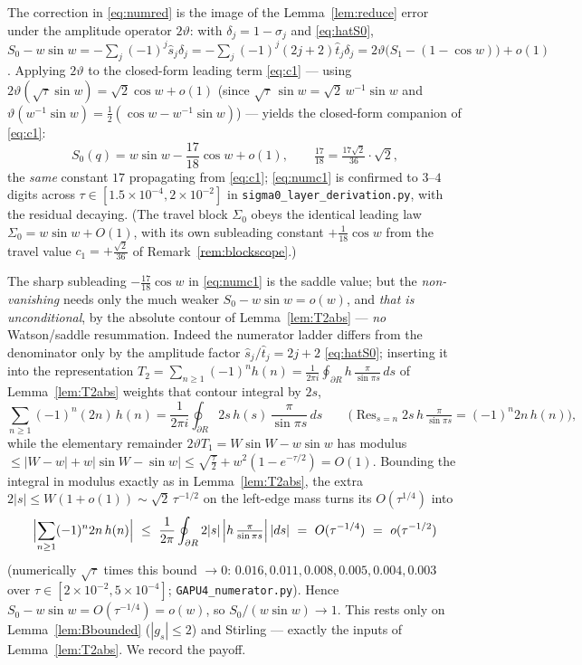 \noindent The correction in \eqref{eq:numred} is the image of the
Lemma~\ref{lem:reduce} error under the amplitude operator $2\vartheta$: with
$\delta_j=1-\sigma_j$ and \eqref{eq:hatS0},
$S_0-w\sin w=-\sum_j(-1)^j\hat s_j\delta_j=-\sum_j(-1)^j(2j+2)\hat t_j\delta_j
=2\vartheta\big(S_1-(1-\cos w)\big)+o(1)$. Applying $2\vartheta$ to the closed-form
leading term \eqref{eq:c1} --- using $2\vartheta(\sqrt\tau\sin w)=\sqrt2\cos w+o(1)$
(since $\sqrt\tau\,\sin w=\sqrt2\,w^{-1}\sin w$ and $\vartheta(w^{-1}\sin w)
=\tfrac12(\cos w-w^{-1}\sin w)$) --- yields the closed-form companion of \eqref{eq:c1}:
\begin{equation}\label{eq:numc1}
  S_0(q)=w\sin w-\frac{17}{18}\cos w+o(1),
  \qquad \tfrac{17}{18}=\tfrac{17\sqrt2}{36}\cdot\sqrt2 ,
\end{equation}
the \emph{same} constant $17$ propagating from \eqref{eq:c1}; \eqref{eq:numc1} is confirmed
to $3$--$4$ digits across $\tau\in[1.5\times10^{-4},2\times10^{-2}]$ in
\texttt{sigma0\_layer\_derivation.py}, with the residual decaying. \big(The travel
block $\Sigma_0$ obeys the identical leading law $\Sigma_0=w\sin w+O(1)$, with its own
subleading constant $+\tfrac1{18}\cos w$ from the travel value $c_1=+\tfrac{\sqrt2}{36}$
of Remark~\ref{rem:blockscope}.\big)

The sharp subleading $-\tfrac{17}{18}\cos w$ in \eqref{eq:numc1} is the saddle value; but the
\emph{non-vanishing} needs only the much weaker $S_0-w\sin w=o(w)$, and \emph{that is unconditional},
by the absolute contour of Lemma~\ref{lem:T2abs} --- \emph{no} Watson/saddle resummation. Indeed the
numerator ladder differs from the denominator only by the amplitude factor $\hat s_j/\hat t_j=2j+2$
\eqref{eq:hatS0}; inserting it into the representation
$T_2=\sum_{n\ge1}(-1)^nh(n)=\tfrac1{2\pi i}\oint_{\partial R}h\,\tfrac{\pi}{\sin\pi s}\,ds$ of
Lemma~\ref{lem:T2abs} weights that contour integral by $2s$,
\[
   \sum_{n\ge1}(-1)^n(2n)\,h(n)=\frac1{2\pi i}\oint_{\partial R}2s\,h(s)\,\frac{\pi}{\sin\pi s}\,ds
   \qquad\bigl(\operatorname{Res}_{s=n}2s\,h\,\tfrac{\pi}{\sin\pi s}=(-1)^n2n\,h(n)\bigr),
\]
while the elementary remainder $2\vartheta T_1=W\sin W-w\sin w$ has modulus
$\le|W-w|+w|\sin W-\sin w|\le\sqrt{\tfrac\tau2}+w^2(1-e^{-\tau/2})=O(1)$. Bounding the integral in modulus
exactly as in Lemma~\ref{lem:T2abs}, the extra $2|s|\le W(1+o(1))\sim\sqrt2\,\tau^{-1/2}$ on the
left-edge mass turns its $O(\tau^{1/4})$ into
\[
   \Bigl|\sum_{n\ge1}(-1)^n2n\,h(n)\Bigr|\ \le\ \frac1{2\pi}\oint_{\partial R}2|s|\,\Bigl|h\,\tfrac{\pi}{\sin\pi s}\Bigr|\,|ds|
   \ =\ O(\tau^{-1/4})\ =\ o(\tau^{-1/2})
\]
\textup(numerically $\sqrt\tau$ times this bound $\to0$: $0.016,0.011,0.008,0.005,0.004,0.003$ over
$\tau\in[2\!\times\!10^{-2},5\!\times\!10^{-4}]$; \texttt{GAPU4\_numerator.py}\textup). Hence
$S_0-w\sin w=O(\tau^{-1/4})=o(w)$, so $S_0/(w\sin w)\to1$. This rests only on Lemma~\ref{lem:Bbounded}
\textup($|g_s|\le2$\textup) and Stirling --- exactly the inputs of Lemma~\ref{lem:T2abs}. We record the payoff.

